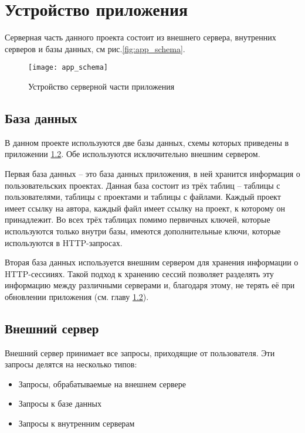 \chapter{Устройство приложения}
	Серверная часть данного проекта состоит из внешнего сервера, внутренних серверов и базы данных, см рис.\ref{fig:app_schema}.
\begin{figure}[h]
	\label{app_schema}
	\begin{center}
	\texttt{[image: app\_schema]}
	\end{center}
	\caption{Устройство серверной части приложения}
\end{figure}	


\section{База данных}
	В данном проекте используются две базы данных, схемы которых приведены в приложении \ref{}. Обе используются исключительно внешним сервером.
	
	Первая база данных -- это база данных приложения, в ней хранится информация о пользовательских проектах. Данная база состоит из трёх таблиц -- таблицы с пользователями, таблицы с проектами и таблицы с файлами. Каждый проект имеет ссылку на автора, каждый файл имеет ссылку на проект, к которому он принадлежит. 
Во всех трёх таблицах помимо первичных ключей, которые используются только внутри базы, имеются дополнительные ключи, которые используются в HTTP-запросах.
	
	Вторая база данных используется внешним сервером для хранения информации о HTTP-сессииях. Такой подход к хранению сессий позволяет разделять эту информацию между различными серверами и, благодаря этому, не терять её при обновлении приложения (см. главу \ref{}). 

	
\section{Внешний сервер}
	Внешний сервер принимает все запросы, приходящие от пользователя. Эти запросы делятся на несколько типов:
\begin{itemize}
	\item Запросы, обрабатываемые на внешнем сервере
	\item Запросы  к базе данных
	\item Запросы к внутренним серверам
\end{itemize}

